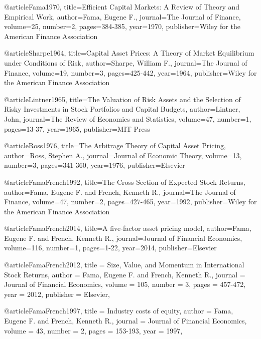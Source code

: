 \documentclass[12pt, a4paper]{article}%
\begin{document}
\begin{thebibliography}{1} %

@article{Fama1970,
    title={Efficient Capital Markets: A Review of Theory and Empirical Work},
    author={Fama, Eugene F.},
    journal={The Journal of Finance},
    volume={25},
    number={2},
    pages={384-385},
    year={1970},
    publisher={Wiley for the American Finance Association}
}

@article{Sharpe1964,
    title={Capital Asset Prices: A Theory of Market Equilibrium under Conditions of Risk},
    author={Sharpe, William F.},
    journal={The Journal of Finance},
    volume={19},
    number={3},
    pages={425-442},
    year={1964},
    publisher={Wiley for the American Finance Association}
}

@article{Lintner1965,
    title={The Valuation of Risk Assets and the Selection of Risky Investments in Stock Portfolios and Capital Budgets},
    author={Lintner, John},
    journal={The Review of Economics and Statistics},
    volume={47},
    number={1},
    pages={13-37},
    year={1965},
    publisher={MIT Press}
}

@article{Ross1976,
    title={The Arbitrage Theory of Capital Asset Pricing},
    author={Ross, Stephen A.},
    journal={Journal of Economic Theory},
    volume={13},
    number={3},
    pages={341-360},
    year={1976},
    publisher={Elsevier}
}

@article{FamaFrench1992,
    title={The Cross-Section of Expected Stock Returns},
    author={Fama, Eugene F. and French, Kenneth R.},
    journal={The Journal of Finance},
    volume={47},
    number={2},
    pages={427-465},
    year={1992},
    publisher={Wiley for the American Finance Association}
}


@article{FamaFrench2014,
    title={A five-factor asset pricing model},
    author={Fama, Eugene F. and French, Kenneth R.},
    journal={Journal of Financial Economics},
    volume={116},
    number={1},
    pages={1-22},
    year={2014},
    publisher={Elsevier}
}


@article{FamaFrench2012,
  title = {Size, Value, and Momentum in International Stock Returns},
  author = {Fama, Eugene F. and French, Kenneth R.},
  journal = {Journal of Financial Economics},
  volume = {105},
  number = {3},
  pages = {457-472},
  year = {2012},
  publisher = {Elsevier},
}


@article{FamaFrench1997,
    title = {Industry costs of equity},
    author = {Fama, Eugene F. and French, Kenneth R.},
    journal = {Journal of Financial Economics},
    volume = {43},
    number = {2},
    pages = {153-193},
    year = {1997},
}


\end{thebibliography}
\end{document}
